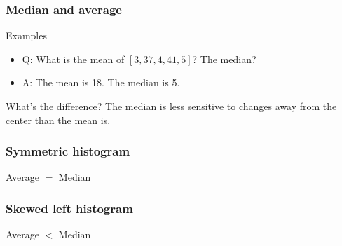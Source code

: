 \documentclass[handout]{beamer}
\begin{document}
   \begin{frame} \frametitle{Median and average}

   \begin{block}
   {Examples}

   \begin{itemize}
   \item Q: What is the mean of $[3,37,4,41,5]$? The median?

   \item A: The mean is 18. The median is 5.

   \end{itemize}

   \end{block}

   \begin{block}
     {What's the difference?}
   The median is less sensitive to changes away from the center than
   the mean is.
   \end{block}
   \end{frame}


   \begin{frame} \frametitle{Symmetric histogram}

   \begin{figure}
   \centering
   \end{figure}

   \begin{center}
   Average $=$ Median
   \end{center}
   \end{frame}


   \begin{frame} \frametitle{Skewed left histogram}

   \begin{figure}
   \centering
   \end{figure}

   \begin{center}
   Average $<$ Median
   \end{center}
   \end{frame}

\end{document}
